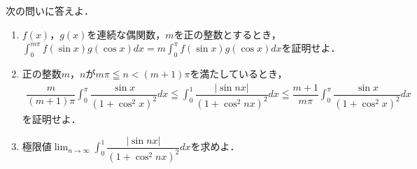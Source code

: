 \documentclass[../../main.tex]{subfiles}
\begin{document}
次の問いに答えよ．
\begin{enumerate}
  \item $f(x)$，$g(x)$を連続な偶関数，$m$を正の整数とするとき，
    $\displaystyle \int_0^{m\pi}f(\sin x)g(\cos x)dx=m\int_0^{\pi}f(\sin x)g(\cos x)dx$を証明せよ．
  \item 正の整数$m$，$n$が$m\pi \leqq n < (m+1)\pi$を満たしているとき，
    \begin{align}
      \dfrac{m}{(m+1)\pi}\int_0^{\pi}\dfrac{\sin x}{(1+\cos^2 x)^2}dx \leqq
      \int_0^1\dfrac{|\sin nx|}{(1+\cos^2 nx)^2}dx \leqq \dfrac{m+1}{m\pi}\int_0^{\pi}\dfrac{\sin x}{(1+\cos^2 x)^2}dx
    \end{align}
    を証明せよ．
  \item 極限値$\displaystyle\lim_{n \to \infty}\int_0^1\dfrac{|\sin nx|}{(1+\cos^2 nx)^2}dx$を求めよ．
\end{enumerate}
\end{document}
